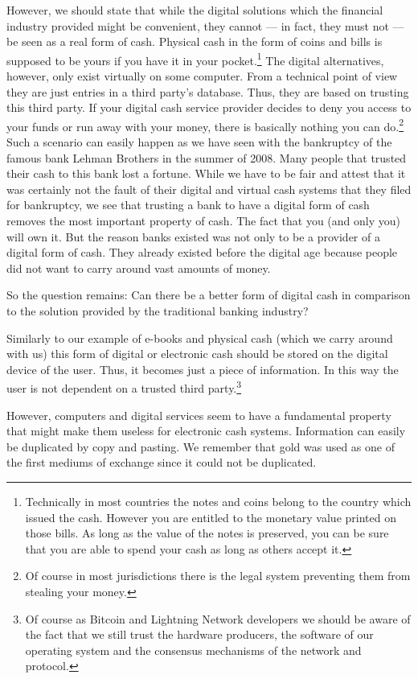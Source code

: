 \documentclass[a4paper,12pt,oneside,openany]{book}
\begin{document}
However, we should state that while the digital solutions which the
financial industry provided might be convenient, they cannot --- in
fact, they must not --- be seen as a real form of cash.  Physical cash
in the form of coins and bills is supposed to be yours if you have it in
your pocket.\footnote{Technically in most countries the notes and coins
  belong to the country which issued the cash.  However you are entitled
  to the monetary value printed on those bills. As long as the value of
  the notes is preserved, you can be sure that you are able to spend
  your cash as long as others accept it.}  The digital alternatives,
however, only exist virtually on some computer.  From a technical point
of view they are just entries in a third party's database.  Thus, they
are based on trusting this third party.  If your digital cash service
provider decides to deny you access to your funds or run away with your
money, there is basically nothing you can do.\footnote{Of course in most
  jurisdictions there is the legal system preventing them from stealing
  your money.}  Such a scenario can easily happen as we have seen with
the bankruptcy of the famous bank Lehman Brothers in the summer of
2008. Many people that trusted their cash to this bank lost a fortune.
While we have to be fair and attest that it was certainly not the fault
of their digital and virtual cash systems that they filed for
bankruptcy, we see that trusting a bank to have a digital form of cash
removes the most important property of cash.  The fact that you (and
only you) will own it.  But the reason banks existed was not only to be
a provider of a digital form of cash.  They already existed before the
digital age because people did not want to carry around vast amounts of
money.

So the question remains: Can there be a better form of digital cash in
comparison to the solution provided by the traditional banking industry?

Similarly to our example of e-books and physical cash (which we carry
around with us) this form of digital or electronic cash should be stored
on the digital device of the user.  Thus, it becomes just a piece of
information.  In this way the user is not dependent on a trusted third
party.\footnote{Of course as Bitcoin and Lightning Network developers we
  should be aware of the fact that we still trust the hardware
  producers, the software of our operating system and the consensus
  mechanisms of the network and protocol.}

However, computers and digital services seem to have a fundamental
property that might make them useless for electronic cash systems.
Information can easily be duplicated by copy and pasting.  We remember
that gold was used as one of the first mediums of exchange since it
could not be duplicated.
\end{document}
